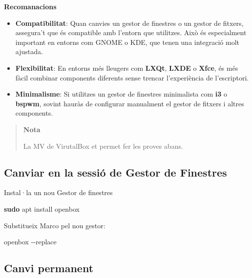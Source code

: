 \documentclass[
  a4paper,
]{article}
\newenvironment{Shaded}{\begin{snugshade}}{\end{snugshade}}
\newcommand{\AttributeTok}[1]{\textcolor[rgb]{0.13,0.29,0.53}{#1}}
\newcommand{\ExtensionTok}[1]{#1}
\newcommand{\FunctionTok}[1]{\textcolor[rgb]{0.13,0.29,0.53}{\textbf{#1}}}
\newcommand{\NormalTok}[1]{#1}
\providecommand{\tightlist}{%
  \setlength{\itemsep}{0pt}\setlength{\parskip}{0pt}}
\begin{document}
\textbf{Recomanacions}

\begin{itemize}
\tightlist
\item
  \textbf{Compatibilitat}: Quan canvies un gestor de finestres o un
  gestor de fitxers, assegura't que és compatible amb l'entorn que
  utilitzes. Això és especialment important en entorns com GNOME o KDE,
  que tenen una integració molt ajustada.
\item
  \textbf{Flexibilitat}: En entorns més lleugers com \textbf{LXQt},
  \textbf{LXDE} o \textbf{Xfce}, és més fàcil combinar components
  diferents sense trencar l'experiència de l'escriptori.
\item
  \textbf{Minimalisme}: Si utilitzes un gestor de finestres minimalista
  com \textbf{i3} o \textbf{bspwm}, sovint hauràs de configurar
  manualment el gestor de fitxers i altres components.
\end{itemize}

\begin{quote}
\textbf{Nota}

La MV de VirutalBox et permet fer les proves abans.
\end{quote}

\subsection{Canviar en la sessió de Gestor de
Finestres}\label{canviar-en-la-sessiuxf3-de-gestor-de-finestres}

Instal·la un nou Gestor de finestres

\begin{Shaded}
\begin{Highlighting}[]
\FunctionTok{sudo}\NormalTok{ apt install openbox}
\end{Highlighting}
\end{Shaded}

Substitueix Marco pel nou gestor:

\begin{Shaded}
\begin{Highlighting}[]
\ExtensionTok{openbox} \AttributeTok{{-}{-}replace}
\end{Highlighting}
\end{Shaded}

\subsection{Canvi permanent}\label{canvi-permanent}
\end{document}
